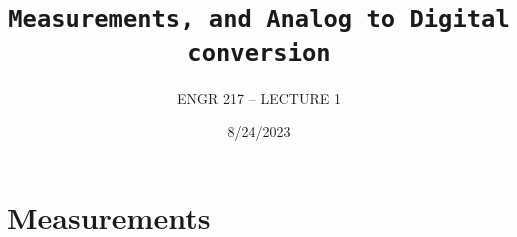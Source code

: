 \documentclass[a4paper,12pt]{article}
\title{\texttt{Measurements, and Analog to Digital conversion}\\\hrulefill}
\author{ENGR 217 – LECTURE 1}
\date{\small{8/24/2023}}
\begin{document}
    \maketitle

    \section{Measurements}
        
\end{document}
